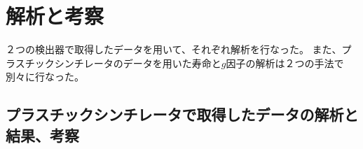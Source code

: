 







%

\section{解析と考察}
２つの検出器で取得したデータを用いて、それぞれ解析を行なった。
また、プラスチックシンチレータのデータを用いた寿命と$g$因子の解析は２つの手法で別々に行なった。

\subsection{プラスチックシンチレータで取得したデータの解析と結果、考察}
